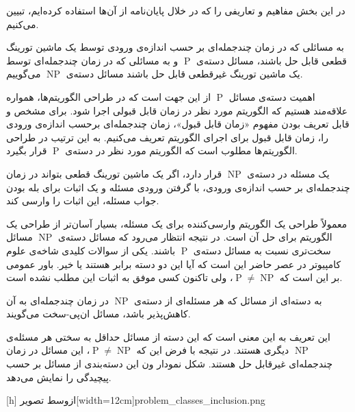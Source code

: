 

در این بخش مفاهیم و تعاریفی را که در خلال پایان‌نامه از آن‌ها استفاده کرده‌ایم، تبیین می‌کنیم.


به مسائلی که در زمان چندجمله‌ای بر حسب اندازه‌ی ورودی توسط یک ماشین تورینگ قطعی قابل حل باشند، مسائل دسته‌ی $\mathrm{\mathop{P}}$ و به مسائلی که در زمان چندجمله‌ای توسط یک ماشین تورینگ غیرقطعی قابل حل باشند مسائل دسته‌ی $\mathrm{\mathop{NP}}$ می‌گوییم.

اهمیت دسته‌ی مسائل $\mathrm{\mathop{P}}$ از این جهت است که در طراحی الگوریتم‌ها، همواره علاقه‌مند هستیم که الگوریتم مورد نظر در زمان قابل قبولی اجرا شود. برای مشخص و قابل تعریف بودن مفهوم «زمان قابل قبول»، زمان چندجمله‌ای برحسب اندازه‌ی ورودی را، زمان قابل قبول برای اجرای الگوریتم تعریف می‌کنیم. به این ترتیب در طراحی الگوریتم‌ها مطلوب است که الگوریتم مورد نظر در دسته‌ی $\mathrm{\mathop{P}}$ قرار بگیرد.

یک مسئله در دسته‌ی $\mathrm{\mathop{NP}}$ قرار دارد، اگر یک ماشین تورینگ قطعی بتواند در زمان چند‌جمله‌ای بر حسب اندازه‌ی ورودی، با گرفتن ورودی مسئله و یک اثبات برای بله بودن جواب مسئله، این اثبات را وارسی کند.

معمولاً طراحی یک الگوریتم وارسی‌کننده برای یک مسئله، بسیار آسان‌تر از طراحی یک الگوریتم برای حل آن است. در نتیجه انتظار می‌رود که مسائل دسته‌ی $\mathrm{\mathop{NP}}$ مسائل سخت‌تری نسبت به مسائل دسته‌ی $\mathrm{\mathop{P}}$ باشند. یکی از سوالات کلیدی شاخه‌ی علوم کامپیوتر در عصر حاضر این است که آیا این دو دسته برابر هستند یا خیر. باور عمومی بر این است که $\mathrm{\mathop{P}} \neq \mathrm{\mathop{NP}}$، ولی تاکنون کسی موفق به اثبات این مطلب نشده است.

به دسته‌ای از مسائل که هر مسئله‌ای از دسته‌ی $\mathrm{\mathop{NP}}$ در زمان چندجمله‌ای به آن کاهش‌پذیر باشد، مسائل ان‌پی-سخت می‌گویند.

این تعریف به این معنی است که این دسته از مسائل حداقل به سختی هر مسئله‌ی $\mathrm{\mathop{NP}}$ دیگری هستند. در نتیجه با فرض این که
$\mathrm{\mathop{P}} \neq \mathrm{\mathop{NP}}$،
این مسائل در زمان چندجمله‌ای غیرقابل حل هستند. شکل  نمودار ون این دسته‌بندی از مسائل بر حسب پیچیدگی را نمایش می‌دهد.

[h]
‌ازوسط
‌تصویر[width=12cm]{problem_classes_inclusion.png}

